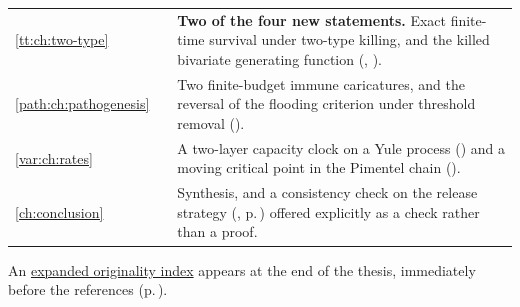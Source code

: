 {\begin{xltabular}{\linewidth}{@{}p{7mm}p{18mm}O@{}}
\ref{tt:ch:two-type} &  & \textbf{Two of the four new statements.} Exact finite-time survival under two-type killing, and the killed bivariate generating function (, ). \\
\ref{path:ch:pathogenesis} &  & Two finite-budget immune caricatures, and the reversal of the flooding criterion under threshold removal (). \\
\ref{var:ch:rates} &  & A two-layer capacity clock on a Yule process () and a moving critical point in the Pimentel chain (). \\
\ref{ch:conclusion} &  & Synthesis, and a consistency check on the \yp{} release strategy (, p.\,\pageref{con:eq:threshold}) offered explicitly as a check rather than a proof. \\
\end{xltabular}\par}

\vspace{0.5\baselineskip}
{\footnotesize\noindent
An \hyperref[oi:details]{expanded originality index} appears at the end of the
thesis, immediately before the references (p.\,\pageref{oi:details}).\par}

\endgroup
